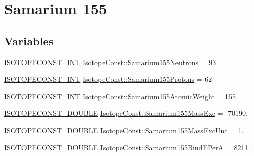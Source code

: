 \hypertarget{group___isotope_const-_samarium-_sm155}{}\section{Samarium 155}
\label{group___isotope_const-_samarium-_sm155}
\subsection*{Variables}
\begin{DoxyCompactItemize}
\item 
\mbox{\hyperlink{group___isotope_const-_macros_ga5f18360b3e99483a35c32d789e62621c}{I\+S\+O\+T\+O\+P\+E\+C\+O\+N\+S\+T\+\_\+\+I\+NT}} \mbox{\hyperlink{group___isotope_const-_samarium-_sm155_ga62f5e4f663f12306f7d935f2a7c80586}{Isotope\+Const\+::\+Samarium155\+Neutrons}} = 93
\item 
\mbox{\hyperlink{group___isotope_const-_macros_ga5f18360b3e99483a35c32d789e62621c}{I\+S\+O\+T\+O\+P\+E\+C\+O\+N\+S\+T\+\_\+\+I\+NT}} \mbox{\hyperlink{group___isotope_const-_samarium-_sm155_ga020aad036ec0c165b7150d89796c2896}{Isotope\+Const\+::\+Samarium155\+Protons}} = 62
\item 
\mbox{\hyperlink{group___isotope_const-_macros_ga5f18360b3e99483a35c32d789e62621c}{I\+S\+O\+T\+O\+P\+E\+C\+O\+N\+S\+T\+\_\+\+I\+NT}} \mbox{\hyperlink{group___isotope_const-_samarium-_sm155_gac49b0fb89045d88c6d06f4f7c5751b5b}{Isotope\+Const\+::\+Samarium155\+Atomic\+Weight}} = 155
\item 
\mbox{\hyperlink{group___isotope_const-_macros_ga8f45a7272ce02c0b4c65c44636ed719a}{I\+S\+O\+T\+O\+P\+E\+C\+O\+N\+S\+T\+\_\+\+D\+O\+U\+B\+LE}} \mbox{\hyperlink{group___isotope_const-_samarium-_sm155_gabc3286dfbfc9b640ab8744cee5564422}{Isotope\+Const\+::\+Samarium155\+Mass\+Exc}} = -\/70190.
\item 
\mbox{\hyperlink{group___isotope_const-_macros_ga8f45a7272ce02c0b4c65c44636ed719a}{I\+S\+O\+T\+O\+P\+E\+C\+O\+N\+S\+T\+\_\+\+D\+O\+U\+B\+LE}} \mbox{\hyperlink{group___isotope_const-_samarium-_sm155_ga85fa26ddfd35eeea4f23ac5cbfcf7dcb}{Isotope\+Const\+::\+Samarium155\+Mass\+Exc\+Unc}} = 1.
\item 
\mbox{\hyperlink{group___isotope_const-_macros_ga8f45a7272ce02c0b4c65c44636ed719a}{I\+S\+O\+T\+O\+P\+E\+C\+O\+N\+S\+T\+\_\+\+D\+O\+U\+B\+LE}} \mbox{\hyperlink{group___isotope_const-_samarium-_sm155_ga5a901635eccb287f6b865e9390ea96af}{Isotope\+Const\+::\+Samarium155\+Bind\+E\+PerA}} = 8211.
\item 

\end{DoxyCompactItemize}
